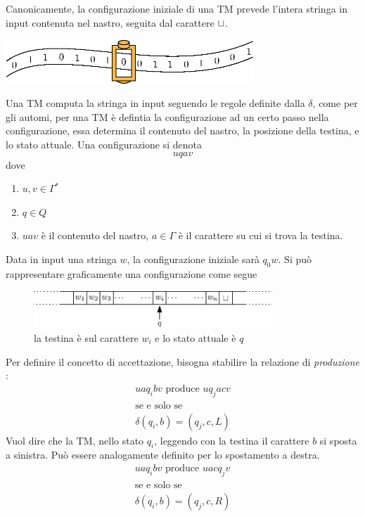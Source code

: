 \documentclass[10pt, letterpaper]{report}
\begin{document}
Canonicamente, la configurazione iniziale di una TM prevede l'intera stringa in input contenuta nel nastro, seguita 
dal carattere ${\sqcup}$.\begin{center}
    \includegraphics[width=0.7\textwidth ]{images/turingMachine.eps}
\end{center}
Una TM computa la stringa in input seguendo le regole definite dalla $\delta$, come per gli automi, per una 
TM è defintia la configurazione ad un certo passo nella configurazione, essa determina il contenuto del nastro, la 
posizione della testina, e lo stato attuale. Una configurazione si denota $$ uqav$$ dove \begin{enumerate}
    \item $u,v\in\Gamma^*$
    \item $q\in Q$
    \item $uav$ è il contenuto del nastro, $a\in\Gamma$ è il carattere su cui si trova la testina.
\end{enumerate}
Data in input una stringa $w$, la configurazione iniziale sarà $q_0w$. Si può rappresentare graficamente una 
configurazione come segue\begin{center}\begin{figure}[h!]
    \centering 
    \includegraphics[width=0.8\textwidth ]{images/confTM.eps}
    \caption{la testina è sul carattere $w_i$ e lo stato attuale è $q$}
\end{figure}
\end{center}
Per definire il concetto di accettazione, bisogna stabilire la relazione di \textit{produzione} :
 $$\begin{matrix}
    uaq_ibv \text{ produce }uq_jacv \\ \text{se e solo se}\\ 
    \delta(q_i,b)=(q_j,c,L)
 \end{matrix} $$
Vuol dire che la TM, nello stato $q_i$, leggendo con la testina il carattere $b$ si sposta a sinistra. Può 
essere analogamente definito per lo spostamento a destra.
$$\begin{matrix}
    uaq_ibv \text{ produce }uacq_jv \\ \text{se e solo se}\\ 
    \delta(q_i,b)=(q_j,c,R)
 \end{matrix} $$
\end{document}
